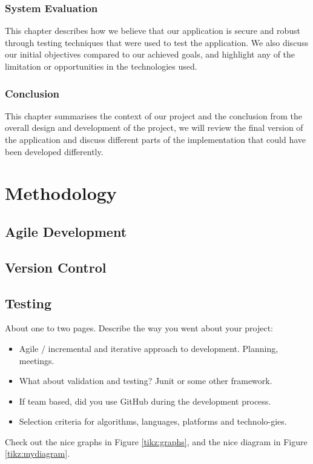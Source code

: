 \subsection{System Evaluation}
This chapter describes how we believe that our application is secure and robust through testing techniques that were used to test the application. We also discuss our initial objectives compared to our achieved goals, and highlight any of the limitation or opportunities in the technologies used.


\subsection{Conclusion}
This chapter summarises the context of our project and the conclusion from the overall design and development of the project, we will review the final version of the application and discuss different parts of the implementation that could have been developed differently.

\chapter{Methodology}

\section{Agile Development}

\section{Version Control}

\section{Testing}

About one to two pages.
Describe the way you went about your project:
\begin{itemize}
\item Agile / incremental and iterative approach to development. Planning, meetings.
\item What about validation and testing? Junit or some other framework.
\item If team based, did you use GitHub during the development process.
\item Selection criteria for algorithms, languages, platforms and technolo-gies.
\end{itemize}
Check out the nice graphs in Figure \ref{tikz:graphs}, and the nice diagram in Figure \ref{tikz:mydiagram}.

